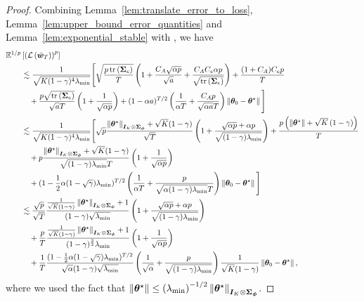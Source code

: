 \begin{proof}
    Combining Lemma~\ref{lem:translate_error_to_loss}, Lemma~\ref{lem:upper_bound_error_quantities} and Lemma~\ref{lem:exponential_stable} with \citep[Theorem~2][]{samsonov2024improved}, we have
    \begin{equation*}
       \begin{aligned}
        &{\mathbb E}^{1/p}\left[{\left({{\mathcal{L}}\left({\bar{{\bm{w}}}_T}\right)}\right)^p}\right]\\
        &\qquad\lesssim \frac{1}{\sqrt{K(1-\gamma)^4\lambda_{\min}}}\Bigg[\sqrt{\frac{p\operatorname{tr}\left({{\bm{\Sigma}}_e}\right)}{T}}\left({1+\frac{C_A\sqrt{\alpha p}}{\sqrt{a}}+\frac{C_A C_e \alpha p}{\sqrt{\operatorname{tr}\left({{\bm{\Sigma}}_e}\right)}}}\right)+\frac{(1+C_A)C_e p}{T}\\
        &\qquad\quad+\frac{p\sqrt{\operatorname{tr}\left({{\bm{\Sigma}}_e}\right)}}{\sqrt{a}T}\left({1+\frac{1}{\sqrt{\alpha p}}}\right)+(1-\alpha a)^{T/2}\left({\frac{1}{\alpha T}+\frac{C_A p}{\sqrt{\alpha a}T}}\right)\left\|{{\bm{\theta}}_0-{\bm{\theta}}^{\star}}\right\| \Bigg]\\
        &\qquad\lesssim\frac{1}{\sqrt{K(1-\gamma)^4\lambda_{\min}}}\Bigg[\sqrt{p}\frac{\left\|{{\bm{\theta}}^{\star}}\right\|_{{\bm{I}}_K\otimes{\bm{\Sigma}}_{{\bm{\phi}}}}+\sqrt{K}(1-\gamma)}{\sqrt{T}}\left({1+\frac{\sqrt{\alpha p}+\alpha p}{\sqrt{(1-\gamma)\lambda_{\min}}}}\right)+\frac{p\left({\left\|{{\bm{\theta}}^{\star}}\right\|+\sqrt{K}\left({1-\gamma}\right)}\right)}{T}\\
        &\qquad\quad+p\frac{\left\|{{\bm{\theta}}^{\star}}\right\|_{{\bm{I}}_K\otimes{\bm{\Sigma}}_{{\bm{\phi}}}}+\sqrt{K}(1-\gamma)}{\sqrt{ (1-\gamma)\lambda_{\min}}T}\left({1+\frac{1}{\sqrt{\alpha p}}}\right)\\
        &\qquad\quad+(1-\frac{1}{2}\alpha (1-\sqrt\gamma)\lambda_{\min} )^{T/2}\left({\frac{1}{\alpha T}+\frac{p}{\sqrt{\alpha (1-\gamma)\lambda_{\min}}T}}\right)\left\|{{\bm{\theta}}_0-{\bm{\theta}}^{\star}}\right\| \Bigg]\\
        &\qquad\lesssim\frac{\sqrt{p}}{\sqrt{T}}\frac{\frac{1}{\sqrt{K}(1-\gamma)}\left\|{{\bm{\theta}}^{\star}}\right\|_{{\bm{I}}_K\otimes{\bm{\Sigma}}_{{\bm{\phi}}}}+1}{(1-\gamma)\sqrt{\lambda_{\min}}}\left({1+\frac{\sqrt{\alpha p}+\alpha p}{\sqrt{(1-\gamma)\lambda_{\min}}}}\right)\\
        &\qquad\quad+\frac{p}{T}\frac{\frac{1}{\sqrt{K}(1-\gamma)}\left\|{{\bm{\theta}}^{\star}}\right\|_{{\bm{I}}_K\otimes{\bm{\Sigma}}_{{\bm{\phi}}}}+1}{(1-\gamma)^{\frac{3}{2}}\lambda_{\min}}\left({1+\frac{1}{\sqrt{\alpha p}}}\right)\\
        &\qquad\quad+\frac{1}{T}\frac{(1-\frac{1}{2}\alpha (1-\sqrt\gamma)\lambda_{\min} )^{T/2}}{ \sqrt{\alpha}(1-\gamma)\sqrt{\lambda_{\min}}}\left({\frac{1}{\sqrt\alpha}+\frac{p}{\sqrt{ (1-\gamma)\lambda_{\min}}}}\right)\frac{1}{\sqrt{K}(1-\gamma)}\left\|{{\bm{\theta}}_0-{\bm{\theta}}^{\star}}\right\|,
       \end{aligned}
    \end{equation*}
    where we used the fact that $\left\|{{\bm{\theta}}^{\star}}\right\|\leq \left({\lambda_{\min}}\right)^{-1/2}\left\|{{\bm{\theta}}^{\star}}\right\|_{{\bm{I}}_K\otimes{\bm{\Sigma}}_{{\bm{\phi}}}}$.
\end{proof}

